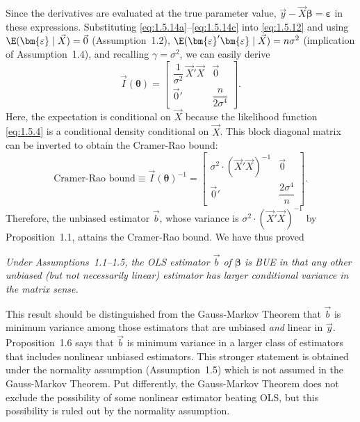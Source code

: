 Since the derivatives are evaluated at the true parameter value,
$\vec{y} - \vec{X}\bm{\beta} = \bm{\varepsilon}$ in these expressions.  Substituting
\eqref{eq:1.5.14a}--\eqref{eq:1.5.14c} into \eqref{eq:1.5.12} and using
$\E(\bm{\varepsilon} \mid \vec{X}) = \vec{0}$ (Assumption~1.2),
$\E(\bm{\varepsilon}'\bm{\varepsilon} \mid \vec{X}) = n\sigma^2$ (implication of
Assumption~1.4), and recalling $\gamma = \sigma^2$, we can easily derive
%
\begin{equation}
  \vec{I}(\bm{\theta})
    = \begin{bmatrix}
        \dfrac{1}{\sigma^2}\,\vec{X}'\vec{X} & \vec{0} \\[8pt]
        \vec{0}' & \dfrac{n}{2\sigma^4}
      \end{bmatrix}.
  \label{eq:1.5.15}
\end{equation}
%
Here, the expectation is conditional on $\vec{X}$ because the likelihood function
\eqref{eq:1.5.4} is a conditional density conditional on $\vec{X}$.  This block diagonal
matrix can be inverted to obtain the Cramer-Rao bound:
%
\begin{equation}
  \text{Cramer-Rao bound}
    \equiv \vec{I}(\bm{\theta})^{-1}
    = \begin{bmatrix}
        \sigma^2 \cdot (\vec{X}'\vec{X})^{-1} & \vec{0} \\[8pt]
        \vec{0}' & \dfrac{2\sigma^4}{n}
      \end{bmatrix}.
  \label{eq:1.5.16}
\end{equation}
%
Therefore, the unbiased estimator $\vec{b}$, whose variance is
$\sigma^2 \cdot (\vec{X}'\vec{X})^{-1}$ by Proposition~1.1, attains the Cramer-Rao bound.
We have thus proved

\begin{proposition}
\label{prop:1.6}
\textit{Under Assumptions~1.1--1.5, the OLS estimator\/ $\vec{b}$ of\/ $\bm{\beta}$ is BUE
in that any other unbiased (but not necessarily linear) estimator has larger conditional
variance in the matrix sense.}
\end{proposition}

This result should be distinguished from the Gauss-Markov Theorem that $\vec{b}$ is
minimum variance among those estimators that are unbiased \textit{and} linear in $\vec{y}$.
Proposition~1.6 says that $\vec{b}$ is minimum variance in a larger class of estimators
that includes nonlinear unbiased estimators.  This stronger statement is obtained under the
normality assumption (Assumption~1.5) which is not assumed in the Gauss-Markov Theorem.
Put differently, the Gauss-Markov Theorem does not exclude the possibility of some
nonlinear estimator beating OLS, but this possibility is ruled out by the normality
assumption.

